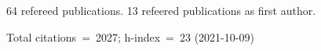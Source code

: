 64 refereed publications. 13 refeered publications as first author.

Total citations~=~2027; h-index~=~23 (2021-10-09)